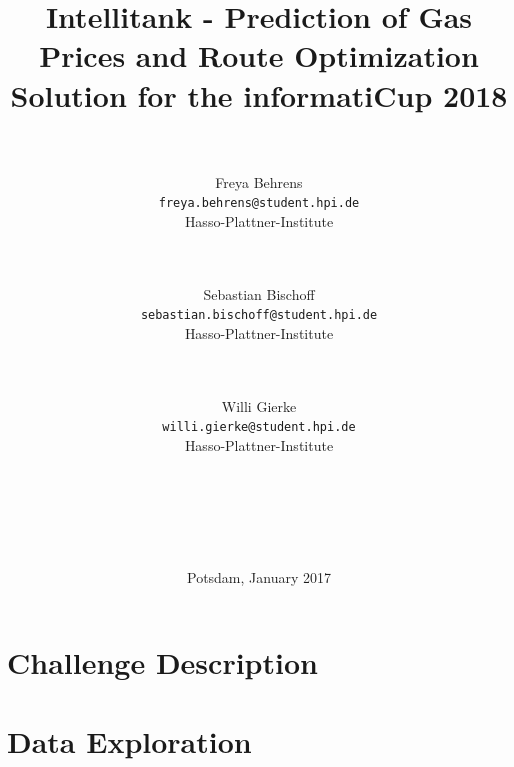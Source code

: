 \documentclass[%
a4paper,
DIV12,
2.5headlines,
bigheadings,
titlepage,
openbib,
]{scrartcl}
\begin{document}
\providecommand{\tightlist}{%
  \setlength{\itemsep}{0pt}\setlength{\parskip}{0pt}}

\DeclareRobustCommand{\desiredTitle}{
  Intellitank - Prediction of Gas Prices and Route Optimization \\\normalsize{Solution for the informatiCup 2018}
}

\DeclareRobustCommand{\desiredAuthor}{
  \\\\Freya Behrens\\\texttt{freya.behrens@student.hpi.de}\\Hasso-Plattner-Institute \and \\\\Sebastian Bischoff\\\texttt{sebastian.bischoff@student.hpi.de}\\Hasso-Plattner-Institute \and \\\\Willi Gierke\\\texttt{willi.gierke@student.hpi.de}\\Hasso-Plattner-Institute\\\\\\\\\\\\
}

\begin{titlepage}
\begin{center}
   \title{\desiredTitle}
   \author{\desiredAuthor}
   \date{Potsdam, January 2017}
   \maketitle
\end{center}
\end{titlepage}

\pagebreak

\tableofcontents
\pagebreak

\section{Challenge Description}\label{challenge-description}


\section{Data Exploration}\label{data-exploration}
\end{document}
